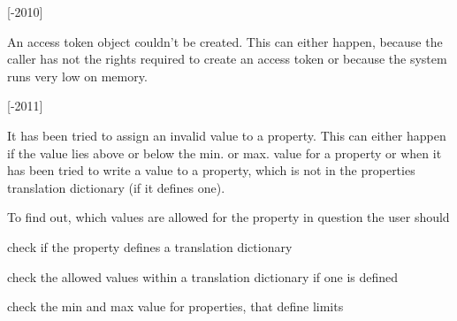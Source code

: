 \begin{Desc}
\begin{description}
{\bfseries }\mbox{[}-\/2010\mbox{]} \item[{\em 
\hypertarget{group___common_interface_gga61b0634ab285d9a2a303e0092167127eacfe8f8a1a9cebbd153516fa7f599b111}{P\+R\+O\+P\+H\+A\+N\+D\+L\+I\+N\+G\+\_\+\+A\+C\+C\+E\+S\+S\+T\+O\+K\+E\+N\+\_\+\+C\+R\+E\+A\+T\+I\+O\+N\+\_\+\+F\+A\+I\+L\+E\+D}\label{group___common_interface_gga61b0634ab285d9a2a303e0092167127eacfe8f8a1a9cebbd153516fa7f599b111}
}]An access token object couldn't be created. This can either happen, because the caller has not the rights required to create an access token or because the system runs very low on memory.

{\bfseries }\mbox{[}-\/2011\mbox{]} \item[{\em 
\hypertarget{group___common_interface_gga61b0634ab285d9a2a303e0092167127ea8c185dd5168dc0a79ee073c761111e50}{P\+R\+O\+P\+H\+A\+N\+D\+L\+I\+N\+G\+\_\+\+I\+N\+V\+A\+L\+I\+D\+\_\+\+P\+R\+O\+P\+\_\+\+V\+A\+L\+U\+E}\label{group___common_interface_gga61b0634ab285d9a2a303e0092167127ea8c185dd5168dc0a79ee073c761111e50}
}]It has been tried to assign an invalid value to a property. This can either happen if the value lies above or below the min. or max. value for a property or when it has been tried to write a value to a property, which is not in the properties translation dictionary (if it defines one).

To find out, which values are allowed for the property in question the user should


\begin{DoxyItemize}
\item check if the property defines a translation dictionary
\item check the allowed values within a translation dictionary if one is defined
\item check the min and max value for properties, that define limits
\end{DoxyItemize}


\end{description}
\end{Desc}
